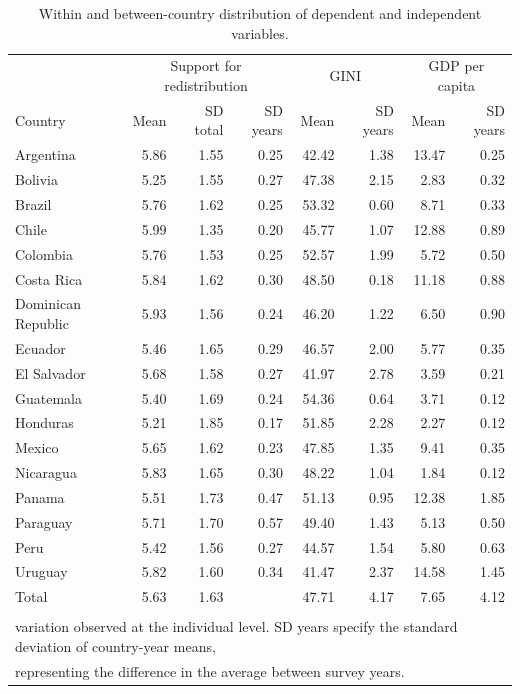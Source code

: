 \documentclass[utf8]{frontiers_suppmat1} %
\begin{document}
\newpage


\begin{table}[h]
\centering
	\caption{Within and between-country distribution of dependent and independent variables.}
	\label{appendix2}
    \renewcommand{\arraystretch}{0.8}
\begin{tabular}{lrrrrrrr}
  \toprule
	 & \multicolumn{3}{c}{Support for redistribution} & \multicolumn{2}{c}{GINI} & \multicolumn{2}{c}{GDP per capita} \\
    Country & Mean & SD total & SD years & Mean & SD years & Mean & SD years \\
  \midrule
  Argentina & 5.86 & 1.55 & 0.25 & 42.42 & 1.38 & 13.47 & 0.25 \\ 
  Bolivia & 5.25 & 1.55 & 0.27 & 47.38 & 2.15 & 2.83 & 0.32 \\ 
  Brazil & 5.76 & 1.62 & 0.25 & 53.32 & 0.60 & 8.71 & 0.33 \\ 
  Chile & 5.99 & 1.35 & 0.20 & 45.77 & 1.07 & 12.88 & 0.89 \\ 
  Colombia & 5.76 & 1.53 & 0.25 & 52.57 & 1.99 & 5.72 & 0.50 \\ 
  Costa Rica & 5.84 & 1.62 & 0.30 & 48.50 & 0.18 & 11.18 & 0.88 \\ 
  Dominican Republic & 5.93 & 1.56 & 0.24 & 46.20 & 1.22 & 6.50 & 0.90 \\ 
  Ecuador & 5.46 & 1.65 & 0.29 & 46.57 & 2.00 & 5.77 & 0.35 \\ 
  El Salvador & 5.68 & 1.58 & 0.27 & 41.97 & 2.78 & 3.59 & 0.21 \\ 
  Guatemala & 5.40 & 1.69 & 0.24 & 54.36 & 0.64 & 3.71 & 0.12 \\ 
  Honduras & 5.21 & 1.85 & 0.17 & 51.85 & 2.28 & 2.27 & 0.12 \\ 
  Mexico & 5.65 & 1.62 & 0.23 & 47.85 & 1.35 & 9.41 & 0.35 \\ 
  Nicaragua & 5.83 & 1.65 & 0.30 & 48.22 & 1.04 & 1.84 & 0.12 \\ 
  Panama & 5.51 & 1.73 & 0.47 & 51.13 & 0.95 & 12.38 & 1.85 \\ 
  Paraguay & 5.71 & 1.70 & 0.57 & 49.40 & 1.43 & 5.13 & 0.50 \\ 
  Peru & 5.42 & 1.56 & 0.27 & 44.57 & 1.54 & 5.80 & 0.63 \\ 
  Uruguay & 5.82 & 1.60 & 0.34 & 41.47 & 2.37 & 14.58 & 1.45 \\ 
  \midrule
  Total & 5.63 & 1.63 &  & 47.71 & 4.17 & 7.65 & 4.12 \\ 
		\botrule
	\multicolumn{8}{l}{\tiny{Note: SD total indicates the standard deviation of the dependent variable across countries. This is the overall}} \\
	\multicolumn{8}{l}{\tiny{variation observed at the individual level. SD years specify the standard deviation of country-year means,}} \\
	\multicolumn{8}{l}{\tiny{representing the difference in the average between survey years.}}
	\end{tabular}
\end{table}
\end{document}

